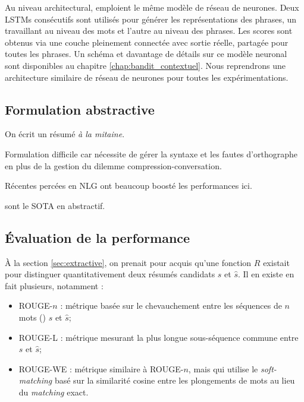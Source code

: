 Au niveau architectural, \citep{dong2018banditsum,luo-etal-2019-reading} emploient le
même modèle de réseau de neurones.
Deux LSTMs consécutifs sont utilisés pour générer les représentations des phrases, un travaillant au niveau
des mots et l'autre au niveau des phrases.
Les scores sont obtenus via une couche pleinement connectée avec sortie réelle, partagée pour toutes les
phrases.
Un schéma et davantage de détails sur ce modèle neuronal sont disponibles
au chapitre \ref{chap:bandit_contextuel}.
Nous reprendrons une architecture similaire de réseau de neurones pour toutes
les expérimentations.

\subsection{Formulation abstractive}

On écrit un résumé \textit{à la mitaine}.

Formulation difficile car nécessite de gérer la syntaxe et les fautes
d'orthographe en plus de la gestion du dilemme compression-conversation.

Récentes percées en NLG ont beaucoup boosté les performances ici.

\citep{2020t5, unilm, zhang2019pegasus} sont le SOTA en abstractif.

\subsection{Évaluation de la performance}
\label{sec:rouge}

À la section \ref{sec:extractive}, on prenait pour acquis qu'une fonction $R$ existait
pour distinguer quantitativement deux résumés candidats $s$ et $\hat{s}$.
Il en existe en fait plusieurs, notamment :

\begin{itemize}
    \item ROUGE-$n$ \citep{lin-2004-rouge}: métrique basée sur le chevauchement entre les séquences de $n$ mots (\ngrams)
          $s$ et $\hat{s}$;
    \item ROUGE-L \citep{lin-2004-rouge}: métrique mesurant la plus longue sous-séquence commune
          entre $s$ et $\hat{s}$;
    \item ROUGE-WE \citep{ng-abrecht-2015-better}: métrique similaire à ROUGE-$n$, mais qui utilise
          le \textit{soft-matching} basé sur la similarité cosine entre les plongements de mots au lieu
          du \textit{matching} exact.
\end{itemize}


